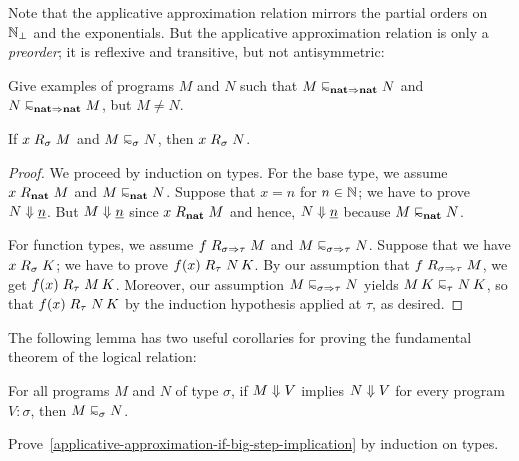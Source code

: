 Note that the applicative approximation relation mirrors the partial orders on
\(\mathbb N_\bot\) and the exponentials.
%
But the applicative approximation relation is only a \emph{preorder}; it is
reflexive and transitive, but not antisymmetric:

\begin{exercise}\label{exer:applicative-approximation-not-antisymmetric}
  Give examples of programs \(M\) and \(N\) such that
  \(M \appapprox_{\pcfnat \pcffun \pcfnat} N\) and
  \(N \appapprox_{\pcfnat \pcffun \pcfnat} M\), but \(M \neq N\).
\end{exercise}

\begin{lemma}\label{R-extend-right}
  If \(x \mathrel{R}_\sigma M\) and \(M \appapprox_\sigma N\), then
  \(x \mathrel{R}_\sigma N\).
\end{lemma}
\begin{proof}
  We proceed by induction on types.
  For the base type, we assume \(x \mathrel{R}_\mathtt{\mathbf{nat}} M\) and
  \(M \appapprox_\pcfnat N\). Suppose that \(x = n\) for \(n \in \mathbb N\); we have
  to prove \(N \Downarrow \underline{n}\). But \(M \Downarrow \underline{n}\) since
  \(x \mathrel{R}_\mathtt{\mathbf{nat}} M\) and hence, \(N \Downarrow \underline{n}\) because
  \(M \appapprox_\pcfnat N\).

  For function types, we assume \(f \mathrel{R}_{\sigma \Rightarrow \tau} M\) and
  \(M \appapprox_{\sigma \pcffun \tau} N\). Suppose that we have
  \(x \mathrel{R}_\sigma K\); we have to prove \(f(x) \mathrel{R}_\tau N \, K\).
  By our assumption that \(f \mathrel{R}_{\sigma \Rightarrow \tau} M\), we get
  \(f(x) \mathrel{R}_\tau M \, K\). Moreover, our assumption
  \(M \appapprox_{\sigma \pcffun \tau} N\) yields
  \(M \, K \appapprox_\tau N \, K\), so that \(f(x) \mathrel{R}_\tau N \, K\) by the
  induction hypothesis applied at \(\tau\), as desired.
\end{proof}

The following lemma has two useful corollaries for proving the fundamental
theorem of the logical relation:
\begin{lemma}\label{applicative-approximation-if-big-step-implication}
  For all programs \(M\) and \(N\) of type \(\sigma\), if \(M \Downarrow V\)
  implies \(N \Downarrow V\) for every program \(V : \sigma\), then
  \(M \appapprox_\sigma N\).
\end{lemma}

\begin{exercise}\label{exer:applicative-approximation-if-big-step-implication}
  Prove~\cref{applicative-approximation-if-big-step-implication} by induction on
  types.
\end{exercise}

